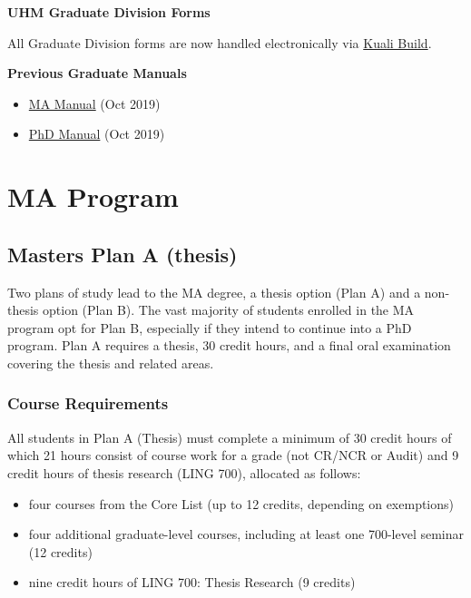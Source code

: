 \documentclass[
]{book}
\providecommand{\tightlist}{%
  \setlength{\itemsep}{0pt}\setlength{\parskip}{0pt}}
\begin{document}
\textbf{UHM Graduate Division Forms}

All Graduate Division forms are now handled electronically via \href{https://manoa.hawaii.edu/graduate/kuali-build-forms/}{Kuali Build}.

\textbf{Previous Graduate Manuals}

\begin{itemize}
\tightlist
\item
  \href{docs/MA-Manual-FINAL-October-2019.pdf}{MA Manual} (Oct 2019)
\item
  \href{docs/PhD-Manual-FINAL-October-2019}{PhD Manual} (Oct 2019)
\end{itemize}

\hypertarget{part-ma-program}{%
\part*{MA Program}\label{part-ma-program}}

\hypertarget{maprogram}{%
\chapter{Masters Plan A (thesis)}\label{maprogram}}

Two plans of study lead to the MA degree, a thesis option (Plan A) and a non-thesis option (Plan B). The vast majority of students enrolled in the MA program opt for Plan B, especially if they intend to continue into a PhD program. Plan A requires a thesis, 30 credit hours, and a final oral examination covering the thesis and related areas.

\hypertarget{course-requirements}{%
\section{Course Requirements}\label{course-requirements}}

All students in Plan A (Thesis) must complete a minimum of 30 credit hours of which 21 hours consist of course work for a grade (not CR/NCR or Audit) and 9 credit hours of thesis research (LING 700), allocated as follows:

\begin{itemize}
\tightlist
\item
  four courses from the Core List (up to 12 credits, depending on exemptions)
\item
  four additional graduate-level courses, including at least one 700-level seminar (12 credits)
\item
  nine credit hours of LING 700: Thesis Research (9 credits)
\end{itemize}
\end{document}
